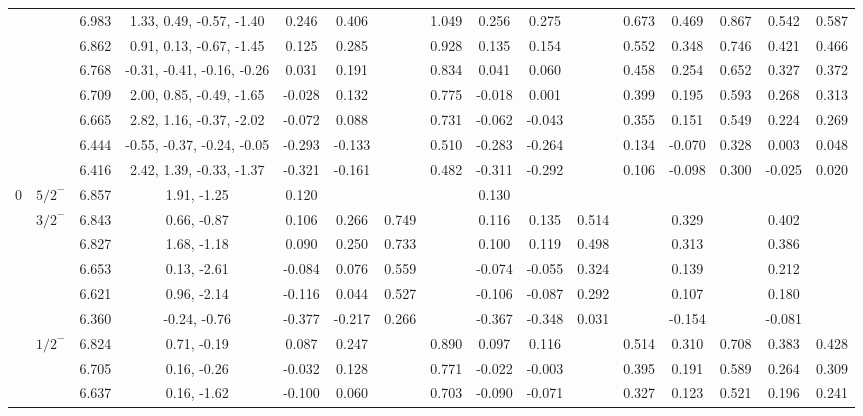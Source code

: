 \documentclass[prd,twocolumn,floatfix,nofootinbib]{revtex4}
\begin{document}
\begin{table*}[!htbp]
\begin{tabular}{cc|cc|cccccccccccc}
            &               &6.983  &1.33, 0.49, -0.57, -1.40 &0.246 &0.406 & &1.049 &0.256 &0.275 & &0.673 &0.469 &0.867 &0.542 &0.587 \\
            &               &6.862  &0.91, 0.13, -0.67, -1.45 &0.125 &0.285 & &0.928 &0.135 &0.154 & &0.552 &0.348 &0.746 &0.421 &0.466 \\
            &               &6.768  &-0.31, -0.41, -0.16, -0.26 &0.031 &0.191 & &0.834 &0.041 &0.060 & &0.458 &0.254 &0.652 &0.327 &0.372 \\
            &               &6.709  &2.00, 0.85, -0.49, -1.65 &-0.028 &0.132 & &0.775 &-0.018 &0.001 & &0.399 &0.195 &0.593 &0.268 &0.313 \\
            &               &6.665  &2.82, 1.16, -0.37, -2.02 &-0.072 &0.088 & &0.731 &-0.062 &-0.043 & &0.355 &0.151 &0.549 &0.224 &0.269 \\
            &               &6.444  &-0.55, -0.37, -0.24, -0.05 &-0.293 &-0.133 & &0.510 &-0.283 &-0.264 & &0.134 &-0.070 &0.328 &0.003 &0.048 \\
            &               &6.416  &2.42, 1.39, -0.33, -1.37 &-0.321 &-0.161 & &0.482 &-0.311 &-0.292 & &0.106 &-0.098 &0.300 &-0.025 &0.020 \\
        0
            &${5/2}^{-}$    &6.857  &1.91, -1.25 &0.120 & & & &0.130 & & & & & & & \\
            &${3/2}^{-}$    &6.843  &0.66, -0.87 &0.106 &0.266 &0.749 & &0.116 &0.135 &0.514 & &0.329 & &0.402 & \\
            &               &6.827  &1.68, -1.18 &0.090 &0.250 &0.733 & &0.100 &0.119 &0.498 & &0.313 & &0.386 & \\
            &               &6.653  &0.13, -2.61 &-0.084 &0.076 &0.559 & &-0.074 &-0.055 &0.324 & &0.139 & &0.212 & \\
            &               &6.621  &0.96, -2.14 &-0.116 &0.044 &0.527 & &-0.106 &-0.087 &0.292 & &0.107 & &0.180 & \\
            &               &6.360  &-0.24, -0.76 &-0.377 &-0.217 &0.266 & &-0.367 &-0.348 &0.031 & &-0.154 & &-0.081 & \\
            &${1/2}^{-}$    &6.824  &0.71, -0.19 &0.087 &0.247 & &0.890 &0.097 &0.116 & &0.514 &0.310 &0.708 &0.383 &0.428 \\
            &               &6.705  &0.16, -0.26 &-0.032 &0.128 & &0.771 &-0.022 &-0.003 & &0.395 &0.191 &0.589 &0.264 &0.309 \\
            &               &6.637  &0.16, -1.62 &-0.100 &0.060 & &0.703 &-0.090 &-0.071 & &0.327 &0.123 &0.521 &0.196 &0.241 \\

\end{tabular}
\end{table*}
\end{document}
